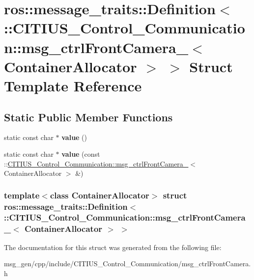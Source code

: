 \hypertarget{structros_1_1message__traits_1_1_definition_3_01_1_1_c_i_t_i_u_s___control___communication_1_1msc6eac41e0087b1e5ef8b14d87be6fc0e}{\section{ros\-:\-:message\-\_\-traits\-:\-:\-Definition$<$ \-:\-:\-C\-I\-T\-I\-U\-S\-\_\-\-Control\-\_\-\-Communication\-:\-:msg\-\_\-ctrl\-Front\-Camera\-\_\-$<$ \-Container\-Allocator $>$ $>$ \-Struct \-Template \-Reference}
\label{structros_1_1message__traits_1_1_definition_3_01_1_1_c_i_t_i_u_s___control___communication_1_1msc6eac41e0087b1e5ef8b14d87be6fc0e}
}
\subsection*{\-Static \-Public \-Member \-Functions}
\begin{DoxyCompactItemize}
\item 
\hypertarget{structros_1_1message__traits_1_1_definition_3_01_1_1_c_i_t_i_u_s___control___communication_1_1msc6eac41e0087b1e5ef8b14d87be6fc0e_a1f67eb88448af2b85ee91f25539fcc81}{static const char $\ast$ {\bfseries value} ()}\label{structros_1_1message__traits_1_1_definition_3_01_1_1_c_i_t_i_u_s___control___communication_1_1msc6eac41e0087b1e5ef8b14d87be6fc0e_a1f67eb88448af2b85ee91f25539fcc81}

\item 
\hypertarget{structros_1_1message__traits_1_1_definition_3_01_1_1_c_i_t_i_u_s___control___communication_1_1msc6eac41e0087b1e5ef8b14d87be6fc0e_aae8b47c109d520d54488d31564f47d6c}{static const char $\ast$ {\bfseries value} (const \-::\hyperlink{struct_c_i_t_i_u_s___control___communication_1_1msg__ctrl_front_camera__}{\-C\-I\-T\-I\-U\-S\-\_\-\-Control\-\_\-\-Communication\-::msg\-\_\-ctrl\-Front\-Camera\-\_\-}$<$ \-Container\-Allocator $>$ \&)}\label{structros_1_1message__traits_1_1_definition_3_01_1_1_c_i_t_i_u_s___control___communication_1_1msc6eac41e0087b1e5ef8b14d87be6fc0e_aae8b47c109d520d54488d31564f47d6c}

\end{DoxyCompactItemize}
\subsubsection*{template$<$class Container\-Allocator$>$ struct ros\-::message\-\_\-traits\-::\-Definition$<$ \-::\-C\-I\-T\-I\-U\-S\-\_\-\-Control\-\_\-\-Communication\-::msg\-\_\-ctrl\-Front\-Camera\-\_\-$<$ Container\-Allocator $>$ $>$}



\-The documentation for this struct was generated from the following file\-:\begin{DoxyCompactItemize}
\item 
msg\-\_\-gen/cpp/include/\-C\-I\-T\-I\-U\-S\-\_\-\-Control\-\_\-\-Communication/msg\-\_\-ctrl\-Front\-Camera.\-h\end{DoxyCompactItemize}
